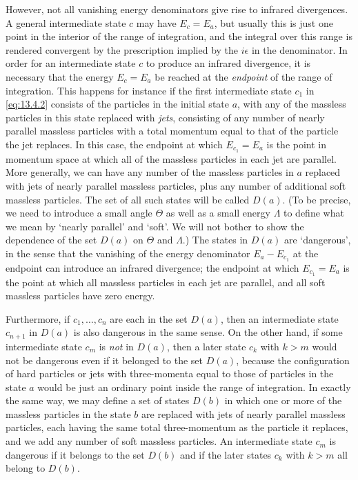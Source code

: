 However, not all vanishing energy denominators give rise to infrared
divergences. A general intermediate state $c$ may have $E_c=E_a$, but usually
this is just one point in the interior of the range of integration, and the
integral over this range is rendered convergent by the prescription implied by
the $i\epsilon$ in the denominator. In order for an intermediate state $c$ to
produce an infrared divergence, it is necessary that the energy $E_c=E_a$ be
reached at the \emph{endpoint} of the range of integration. This happens for
instance if the first intermediate state $c_1$ in \eqref{eq:13.4.2}
consists of the particles in the initial state $a$, with any of the massless
particles in this state replaced with \emph{jets}, consisting of any number of
nearly parallel massless particles with a total momentum equal to that of the
particle the jet replaces. In this case, the endpoint at which $E_{c_1}=E_a$
is the point in momentum space at which all of the massless particles in each
jet are parallel. More generally, we can have any number of the massless
particles in $a$ replaced with jets of nearly parallel massless particles,
plus any number of additional soft massless particles. The set of all such
states will be called $D(a)$. (To be precise, we need to introduce a small
angle $\Theta$ as well as a small energy $\Lambda$ to define what we mean by
`nearly parallel' and `soft'. We will not bother to show the dependence of the
set $D(a)$ on $\Theta$ and $\Lambda$.) The states in $D(a)$ are `dangerous', in
the sense that the vanishing of the energy denominator $E_a-E_{c_1}$ at the
endpoint can introduce an infrared divergence; the endpoint at which
$E_{c_1}=E_a$ is the point at which all massless particles in each jet are
parallel, and all soft massless particles have zero energy.

Furthermore, if $c_1,\ldots,c_n$ are each in the set $D(a)$, then an
intermediate state $c_{n+1}$ in $D(a)$ is also dangerous in the same sense. On
the other hand, if some intermediate state $c_m$ is \emph{not} in $D(a)$, then
a later state $c_k$ with $k>m$ would not be dangerous even if it belonged to
the set $D(a)$, because the configuration of hard particles or jets with
three-momenta equal to those of particles in the state $a$ would be just an
ordinary point inside the range of integration. In exactly the same way, we
may define a set of states $D(b)$ in which one or more of the massless
particles in the state $b$ are replaced with jets of nearly parallel massless
particles, each having the same total three-momentum as the particle it
replaces, and we add any number of soft massless particles. An intermediate
state $c_m$ is dangerous if it belongs to the set $D(b)$ and if the later
states $c_k$ with $k>m$ all belong to $D(b)$.

